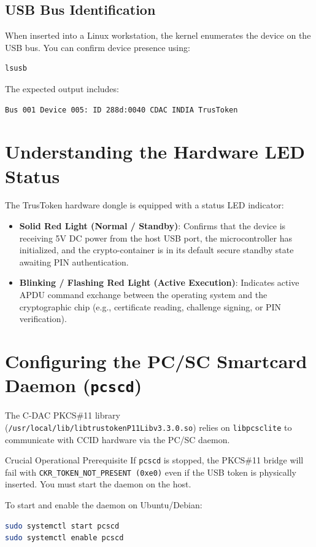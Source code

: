 \documentclass[11pt,a4paper]{report}
\begin{document}
\subsection{USB Bus Identification}
When inserted into a Linux workstation, the kernel enumerates the device on the USB bus. You can confirm device presence using:
\begin{lstlisting}[language=bash]
lsusb
\end{lstlisting}
The expected output includes:
\begin{lstlisting}[language=bash]
Bus 001 Device 005: ID 288d:0040 CDAC INDIA TrusToken
\end{lstlisting}

\section{Understanding the Hardware LED Status}
The TrusToken hardware dongle is equipped with a status LED indicator:
\begin{itemize}
    \item \textbf{Solid Red Light (Normal / Standby)}: Confirms that the device is receiving 5V DC power from the host USB port, the microcontroller has initialized, and the crypto-container is in its default secure standby state awaiting PIN authentication.
    \item \textbf{Blinking / Flashing Red Light (Active Execution)}: Indicates active APDU command exchange between the operating system and the cryptographic chip (e.g., certificate reading, challenge signing, or PIN verification).
\end{itemize}

\section{Configuring the PC/SC Smartcard Daemon (\texttt{pcscd})}
The C-DAC PKCS\#11 library (\texttt{/usr/local/lib/libtrustokenP11Libv3.3.0.so}) relies on \texttt{libpcsclite} to communicate with CCID hardware via the PC/SC daemon.

\begin{alertbox}{Crucial Operational Prerequisite}
If \texttt{pcscd} is stopped, the PKCS\#11 bridge will fail with \texttt{CKR\_TOKEN\_NOT\_PRESENT (0xe0)} even if the USB token is physically inserted. You must start the daemon on the host.
\end{alertbox}

To start and enable the daemon on Ubuntu/Debian:
\begin{lstlisting}[language=bash]
sudo systemctl start pcscd
sudo systemctl enable pcscd
\end{lstlisting}
\end{document}
